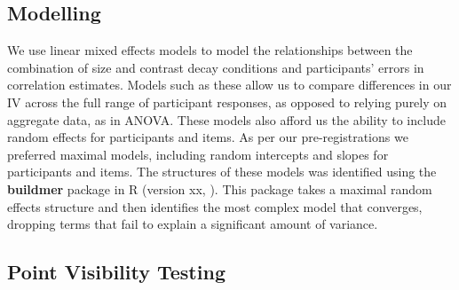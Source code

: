 \documentclass[manuscript, review, anonymous, screen]{acmart}
\begin{document}
\hypertarget{sec-gen-modelling}{%
\subsection{Modelling}\label{sec-gen-modelling}}

We use linear mixed effects models to model the relationships between
the combination of size and contrast decay conditions and participants'
errors in correlation estimates. Models such as these allow us to
compare differences in our IV across the full range of participant
responses, as opposed to relying purely on aggregate data, as in ANOVA.
These models also afford us the ability to include random effects for
participants and items. As per our pre-registrations we preferred
maximal models, including random intercepts and slopes for participants
and items. The structures of these models was identified using the
\textbf{buildmer} package in R (version xx, \citep{voeten_buildmer}).
This package takes a maximal random effects structure and then
identifies the most complex model that converges, dropping terms that
fail to explain a significant amount of variance.

\hypertarget{sec-VT}{%
\subsection{Point Visibility Testing}\label{sec-VT}}
\end{document}
